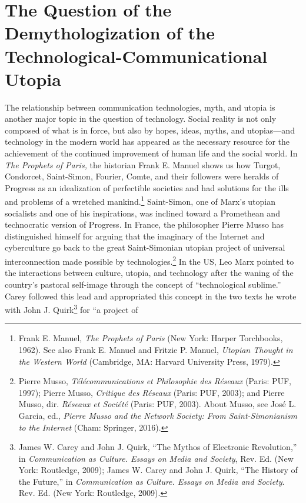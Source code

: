 \documentclass{tufte-handout}
\begin{document}
\hypertarget{the-question-of-the-demythologization-of-the-technological-communicational-utopia}{%
\section{The Question of the Demythologization of the
Technological-Communicational
Utopia}\label{the-question-of-the-demythologization-of-the-technological-communicational-utopia}}

The relationship between communication technologies, myth, and utopia is
another major topic in the question of technology. Social reality is not
only composed of what is in force, but also by hopes, ideas, myths, and
utopias---and technology in the modern world has appeared as the
necessary resource for the achievement of the continued improvement of
human life and the social world. In \emph{The Prophets of Paris,} the
historian Frank E. Manuel shows us how Turgot, Condorcet, Saint-Simon,
Fourier, Comte, and their followers were heralds of Progress as an
idealization of perfectible societies and had solutions for the ills and
problems of a wretched mankind.\footnote{Frank E. Manuel, \emph{The Prophets of Paris} (New York: Harper
  Torchbooks, 1962). See also Frank E. Manuel and Fritzie P. Manuel,
  \emph{Utopian Thought in the Western World} (Cambridge, MA: Harvard
  University Press, 1979).
}
Saint-Simon, one of Marx's utopian socialists and one of his
inspirations, was inclined toward a Promethean and technocratic version
of Progress. In France, the philosopher Pierre Musso has distinguished
himself for arguing that the imaginary of the Internet and cyberculture
go back to the great Saint-Simonian utopian project of universal
interconnection made possible by
technologies.\footnote{Pierre Musso, \emph{Télécommunications et Philosophie des Réseaux}
  (Paris: PUF, 1997); Pierre Musso, \emph{Critique des Réseaux} (Paris:
  PUF, 2003); and Pierre Musso, dir. \emph{Réseaux et Société} (Paris:
  PUF, 2003). About Musso, see José L. Garcia, ed., \emph{Pierre Musso
  and the Network Society: From Saint-Simonianism to the Internet}
  (Cham: Springer, 2016).
} In the US, Leo Marx
pointed to the interactions between culture, utopia, and technology
after the waning of the country's pastoral self-image through the
concept of ``technological sublime.'' Carey followed this lead and
appropriated this concept in the two texts he wrote with John J.
Quirk\footnote{James W. Carey and John J. Quirk, ``The Mythos of Electronic
  Revolution,'' in \emph{Communication as Culture. Essays on Media and
  Society}, Rev. Ed. (New York: Routledge, 2009); James W. Carey and
  John J. Quirk, ``The History of the Future,'' in \emph{Communication
  as Culture. Essays on Media and Society}. Rev. Ed. (New York:
  Routledge, 2009).
} for ``a project of
\end{document}
